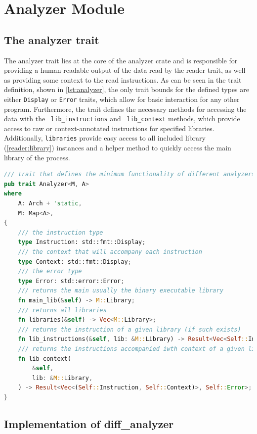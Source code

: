 \section{Analyzer Module}
\label{analyzer}

\subsection{The analyzer trait}
\label{analyzer:trait}

The analyzer trait lies at the core of the analyzer crate and is responsible for providing a human-readable output of the data read by the reader trait, as well as providing some context to the read instructions.
As can be seen in the trait definition, shown in \autoref{lst:analyzer}, the only trait bounds for the defined types are either \verb|Display| or \verb|Error| traits, which allow for basic interaction for any other program.
Furthermore, the trait defines the necessary methods for accessing the data with the \verb| lib_instructions| and \verb| lib_context| methods, which provide access to raw or context-annotated instructions for specified libraries. 
Additionally, \verb|libraries| provide easy access to all included library (\autoref{reader:library}) instances and a helper method to quickly access the main library of the process.

\begin{lstlisting}[caption=\label{lst:analyzer}{The analyzer trait}, language=Rust, breaklines=true]
/// trait that defines the minimum functionality of different analyzers
pub trait Analyzer<M, A>
where
    A: Arch + 'static,
    M: Map<A>,
{
    /// the instruction type
    type Instruction: std::fmt::Display;
    /// the context that will accompany each instruction
    type Context: std::fmt::Display;
    /// the error type
    type Error: std::error::Error;
    /// returns the main usually the binary executable library
    fn main_lib(&self) -> M::Library;
    /// returns all libraries
    fn libraries(&self) -> Vec<M::Library>;
    /// returns the instruction of a given library (if such exists)
    fn lib_instructions(&self, lib: &M::Library) -> Result<Vec<Self::Instruction>, Self::Error>;
    /// returns the instructions accompanied iwth context of a given library
    fn lib_context(
        &self,
        lib: &M::Library,
    ) -> Result<Vec<(Self::Instruction, Self::Context)>, Self::Error>;
}
\end{lstlisting}

\subsection{Implementation of diff\_analyzer}

